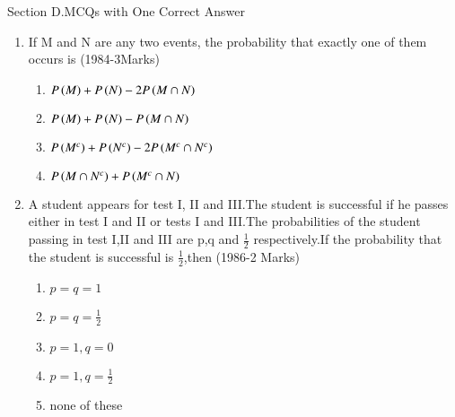 \documentclass[journal,12pt,twocolumn]{IEEEtran}
\theoremstyle{remark}
\begin{document}
\maketitle\Large{Section D.MCQs with One Correct Answer}
\begin{enumerate}
    \item If M and N are any two events, the probability that exactly one of them occurs is \hfill (1984-3Marks)
    \begin{enumerate}
    \item $P\left(M\right)+P\left(N\right)-2P\left(M\cap N\right)$
    \item $P\left(M\right)+P\left(N\right)-P\left(M\cap N\right)$
    \item $P\left(M^{c}\right)+P\left(N^{c}\right)-2P\left(M^{c}\cap N^{c}\right)$
    \item $P\left(M\cap N^{c}\right)+P\left(M^{c}\cap N\right)$    
    \end{enumerate}
    \item A student appears for test I, II and III.The student is successful if he passes either in test I and II or tests I and III.The probabilities of the student passing in test I,II and III are p,q and $\frac{1}{2}$ respectively.If the probability that the student is successful is $\frac{1}{2}$,then \hfill (1986-2 Marks)
    \begin{multicols}{2}
    \begin{enumerate}
        \item $p=q=1$
        \item $p=q=\frac{1}{2}$
        \item $p=1,q=0$
        \item $p=1,q=\frac{1}{2}$
        \item none of these
    \end{enumerate}
        
    \end{multicols}
    
\end{enumerate}
\end{document}
